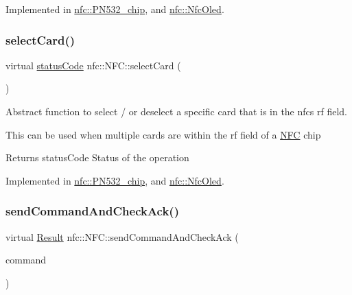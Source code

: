 Implemented in \hyperlink{classnfc_1_1PN532__chip_a8c8bdeb6af78024e6fb2ab119575843a}{nfc\+::\+P\+N532\+\_\+chip}, and \hyperlink{classnfc_1_1NfcOled_a1779648dbd03771141b98ac604ba7982}{nfc\+::\+Nfc\+Oled}.

\mbox{\label{classnfc_1_1NFC_a89a1275bc915581d708c65d487427317}} 
\subsubsection{\texorpdfstring{select\+Card()}{selectCard()}}
{\footnotesize\ttfamily virtual \hyperlink{declarations_8h_ae1d20c5a38cae82ccaa6a77be3fd264b}{status\+Code} nfc\+::\+N\+F\+C\+::select\+Card (\begin{DoxyParamCaption}{ }\end{DoxyParamCaption})\hspace{0.3cm}{\ttfamily [pure virtual]}}



Abstract function to select / or deselect a specific card that is in the nfc\textquotesingle{}s rf field. 

This can be used when multiple cards are within the rf field of a \hyperlink{classnfc_1_1NFC}{N\+FC} chip \begin{DoxyReturn}{Returns}
status\+Code Status of the operation 
\end{DoxyReturn}


Implemented in \hyperlink{classnfc_1_1PN532__chip_a348f7d8d7cf3853e47307efe5f787f34}{nfc\+::\+P\+N532\+\_\+chip}, and \hyperlink{classnfc_1_1NfcOled_a7ae4a0942240950d8db41b75c898cb3c}{nfc\+::\+Nfc\+Oled}.

\mbox{\label{classnfc_1_1NFC_a2a14e65f49707ef1efaea07ec9fce1c8}} 
\subsubsection{\texorpdfstring{send\+Command\+And\+Check\+Ack()}{sendCommandAndCheckAck()}}
{\footnotesize\ttfamily virtual \hyperlink{structnfc_1_1Result}{Result} nfc\+::\+N\+F\+C\+::send\+Command\+And\+Check\+Ack (\begin{DoxyParamCaption}\item[{\hyperlink{classsetupSendCommand}{setup\+Send\+Command} \&}]{command }\end{DoxyParamCaption})\hspace{0.3cm}{\ttfamily [pure virtual]}}



